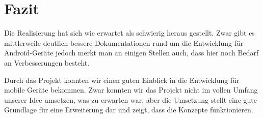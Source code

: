 \chapter{Fazit}
Die Realisierung hat sich wie erwartet als schwierig heraus gestellt. Zwar gibt es mittlerweile deutlich bessere Dokumentationen rund um die Entwicklung für Android-Geräte jedoch merkt man an einigen Stellen auch, dass hier noch Bedarf an Verbesserungen besteht.

Durch das Projekt konnten wir einen guten Einblick in die Entwicklung für mobile Geräte bekommen. Zwar konnten wir das Projekt nicht im vollen Umfang unserer Idee umsetzen, was zu erwarten war, aber die Umsetzung stellt eine gute Grundlage für eine Erweiterung dar und zeigt, dass die Konzepte funktionieren.